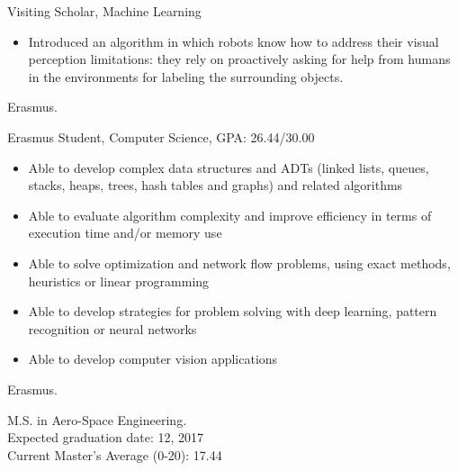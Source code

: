 \documentclass{article}
\begin{document}


\begin{llist}



 
{
Visiting Scholar, Machine Learning
\begin{itemize}
\item[\textendash] Introduced an algorithm in which robots know how to address their visual perception limitations: they rely on proactively asking for help from humans in the environments for labeling the surrounding objects.
\end{itemize}
}
{
Erasmus.
}

 
{
Erasmus Student, Computer Science, GPA: 26.44/30.00
\begin{itemize}
\item[\textendash] Able to develop complex data structures and ADTs (linked lists, queues, stacks, heaps, trees, hash tables and graphs) and related algorithms
\item[\textendash] Able to evaluate algorithm complexity and improve efficiency in terms of execution time and/or memory use
\item[\textendash] Able to solve optimization and network flow problems, using exact methods, heuristics or linear programming
\item[\textendash] Able to develop strategies for problem solving with deep learning, pattern recognition or neural networks
\item[\textendash] Able to develop computer vision applications
\end{itemize}
}
{
Erasmus.
}

 
{
M.S. in Aero-Space Engineering.\\
Expected graduation date: 12, 2017\\
Current Master's Average (0-20): 17.44

}
\end{llist}
\end{document}
